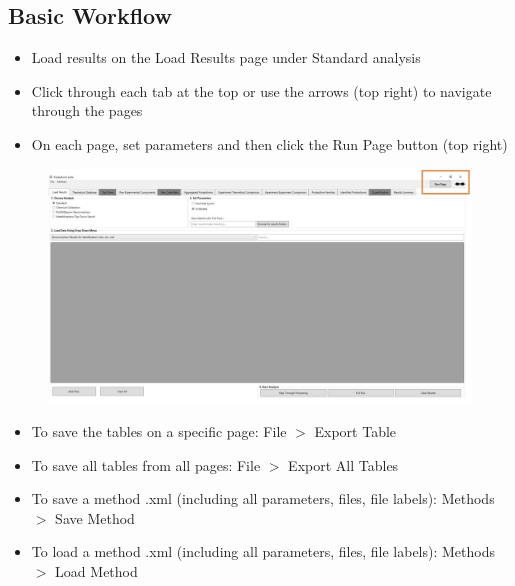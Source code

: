 \subsection{Basic Workflow}
\begin{itemize}
	\item Load results on the Load Results page under Standard analysis
	\item Click through each tab at the top or use the arrows (top right) to navigate through the pages
	\item On each page, set parameters and then click the Run Page button (top right)
\end{itemize}
\begin{figure}[htbp]
\centering
\includegraphics[scale=0.43]{figures/gettingstarted.jpg}
\end{figure}
\begin{itemize}
	\item To save the tables on a specific page: File $>$ Export Table
	\item To save all tables from all pages: File $>$ Export All Tables
	\item To save a method .xml (including all parameters, files, file labels): Methods $>$ Save Method
	\item To load a method .xml (including all parameters, files, file labels): Methods $>$ Load Method
\end{itemize}
